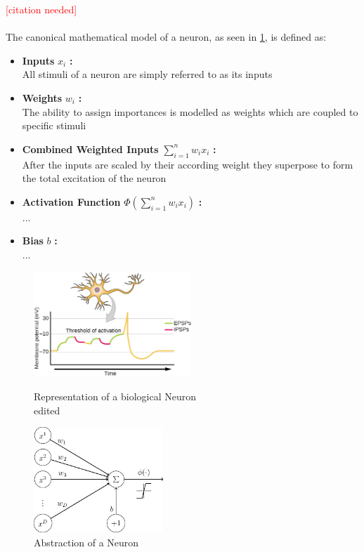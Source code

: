 \textcolor{red}{[citation needed]}\\
\\
The canonical mathematical model of a neuron, as seen in \ref{fig:neuron2}, is defined as:
\begin{itemize}
	\item \textbf{Inputs} $x_i$ \textbf{:}\\
	All stimuli of a neuron are simply referred to as its inputs
	\item \textbf{Weights} $w_i$ \textbf{:}\\
	The ability to assign importances is modelled as weights which are coupled to specific stimuli
	\item \textbf{Combined Weighted Inputs} $\sum_{i=1}^{n}w_i x_i$ \textbf{:}\\
	After the inputs are scaled by their according weight they superpose to form the total excitation of the neuron
	\item \textbf{Activation Function} $\Phi(\sum_{i=1}^{n}w_i x_i)$ \textbf{:}\\
	...
	\item \textbf{Bias} $b$ \textbf{:}\\  
	...
\end{itemize}


\begin{figure}
	\centering
	\begin{minipage}{0.45\textwidth}
		\centering
		\includegraphics[height=150px]{gfx/Biological_Neuron_edited.jpg}
		\caption{Representation of a biological Neuron\\
			\cite{biology} edited}
		\label{fig:neuron1}
	\end{minipage}\hfill
	\begin{minipage}{0.45\textwidth}
		\centering
		\includegraphics[height=150px]{gfx/Abstract_Neuron.png}
		\caption{Abstraction of a Neuron\\
			\cite{abstract_neuron}}
		\label{fig:neuron2}
	\end{minipage}
\end{figure}

